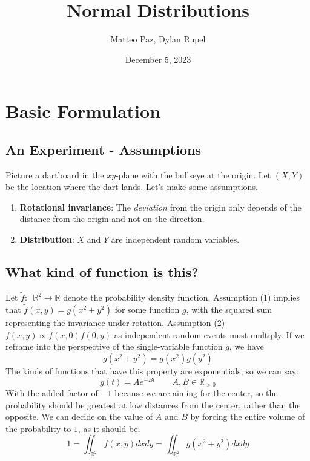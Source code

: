 \documentclass{article}
\author{Matteo Paz, Dylan Rupel}
\date{December 5, 2023}
\title{Normal Distributions}
\begin{document}
\maketitle{}

\section{Basic Formulation}
\subsection{An Experiment - Assumptions}
Picture a dartboard in the $xy$-plane with the bullseye at the origin. 
Let $(X,Y)$ be the location where the dart lands.
\vspace{0.25em}
Let's make some assumptions.
\begin{enumerate}
    \item \textbf{Rotational invariance}:
    The \emph{deviation} from the origin only depends of the distance from the origin and not on the direction.
    \item \textbf{Distribution}: $X$ and $Y$ are independent random variables.
\end{enumerate}
\vspace{0.25em}
\subsection{What kind of function is this?}
Let $\tilde f: \enspace \mathbb{R}^2 \to \mathbb{R}$ denote the probability density function.
Assumption (1) implies that $\tilde f (x,y) = g(x^2 + y^2)$ for some function $g$, with the squared sum representing
the invariance under rotation. Assumption (2) $\tilde f(x,y) \propto \tilde f(x,0)f(0,y)$ as independent random events
must multiply. If we reframe into the perspective of the single-variable function $g$, we have
\[g(x^2 + y^2) = g(x^2)g(y^2)\]
The kinds of functions that have this property are exponentials, so we can say:
\[g(t) = Ae^{-Bt} \qquad A, B \in \mathbb{R}_{> 0}\]
With the added factor of $-1$ because we are aiming for the center,
so the probability should be greatest at low distances from the center, rather than the opposite.
We can decide on the value of $A$ and $B$ by forcing the entire volume of the probability to $1$, as it should be:
\[1 = \iint_{\mathbb{R}^2} \tilde f(x,y) dx dy = \iint_{\mathbb{R}^2} g(x^2+y^2) dxdy\]
\end{document}
